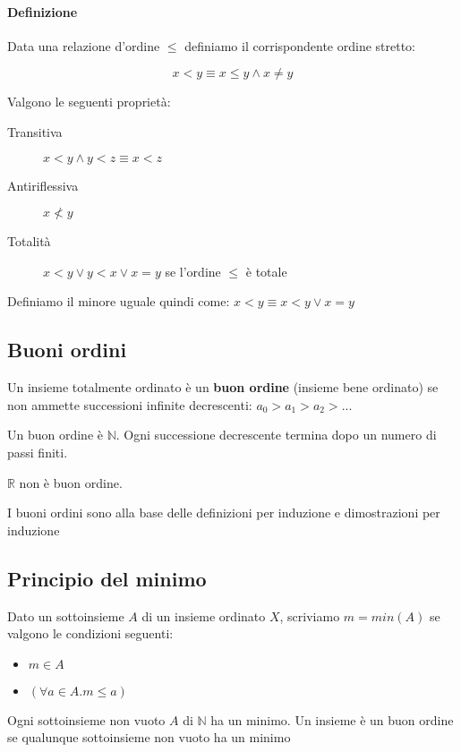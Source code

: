 \paragraph{Definizione}

Data una relazione d'ordine $\le$ definiamo il corrispondente ordine stretto:

$$x < y \equiv x \le y \land x \ne y$$

Valgono le seguenti proprietà:

\begin{description}
	\item [Transitiva] $x < y \land y < z \equiv x < z$	
	\item [Antiriflessiva] $x \not < y$ 
	\item [Totalità] $x < y \lor y < x \lor x = y$ se l'ordine $\le$ è totale 
\end{description}

Definiamo il minore uguale quindi come: $x < y \equiv x < y \lor x = y$

\subsection{Buoni ordini}

Un insieme totalmente ordinato è un {\bf buon ordine} (insieme bene ordinato) se non ammette successioni infinite decrescenti: $a_0 > a_1 > a_2 > ...$

Un buon ordine è $\mathbb{N}$. Ogni successione decrescente termina dopo un numero di passi finiti.

$\mathbb{R}$ non è buon ordine.

I buoni ordini sono alla base delle definizioni per induzione e dimostrazioni per induzione


\subsection{Principio del minimo}

Dato un sottoinsieme $A$ di un insieme ordinato $X$, scriviamo $m = min(A)$ se valgono le condizioni seguenti:

\begin{itemize}

\item $m \in A$
\item $(\forall a \in A . m \le a)$

\end{itemize}

Ogni sottoinsieme non vuoto $A$ di $\mathbb{N}$ ha un minimo.
Un insieme è un buon ordine se qualunque sottoinsieme non vuoto ha un minimo


